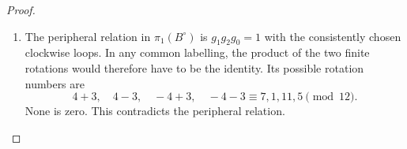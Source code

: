 \begin{proof}
\begin{enumerate}[label=\arabic*.,leftmargin=*]
\item The peripheral relation in
$\pi_1(B^\circ)$ is $g_1g_2g_0=1$ with
the consistently chosen clockwise loops.
In any common labelling, the product of the
two finite rotations would therefore have
to be the identity. Its possible rotation
numbers are
\[
 4+3,\quad4-3,\quad-4+3,\quad-4-3
 \equiv7,1,11,5\pmod {12}.
\]
None is zero. This contradicts the peripheral
relation. 
\end{enumerate}
\end{proof}
